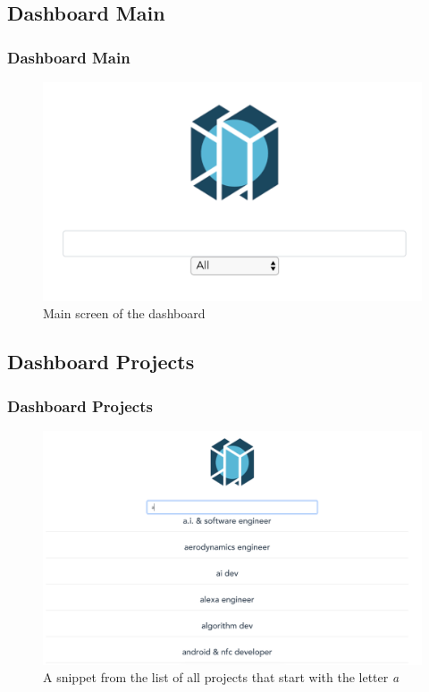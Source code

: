 \documentclass{beamer}
\begin{document}
\subsection{Dashboard Main} 
\begin{frame}
\frametitle{Dashboard Main}
\begin{figure}
	\includegraphics[scale=0.3]{images/DashboardMain} 
	\caption{Main screen of the dashboard}
\end{figure}
\end{frame}

\subsection{Dashboard Projects} 
\begin{frame}
\frametitle{Dashboard Projects}
\begin{figure}
	\includegraphics[scale=0.25]{images/DashboardProjects} 
	\caption{A snippet from the list of all projects that start with the letter \textit{a}}
\end{figure}
\end{frame}
\end{document}
